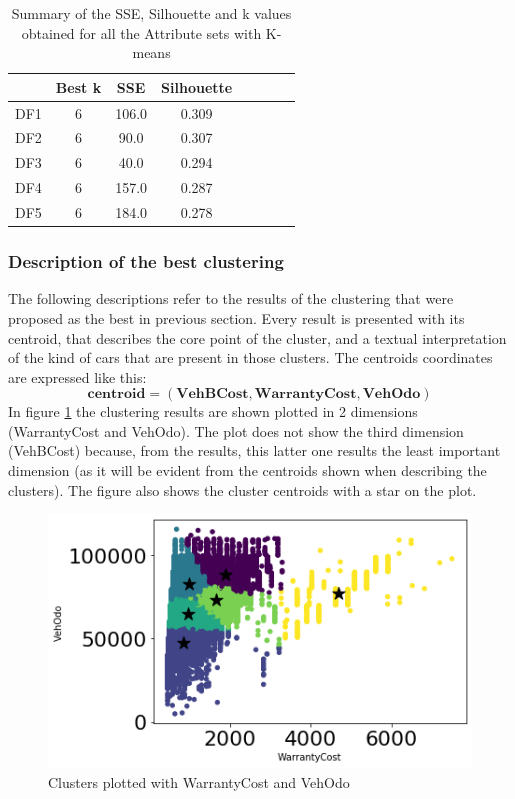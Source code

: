 \documentclass{article}
\begin{document}
	\begin{table}[H]
		\centering
		\begin{tabular}{c|ccccccc}
			\hline
			&  Best k & SSE& Silhouette \\
			\hline
			\rowcolor{Gray}
			DF1 & 6 & 106.0 & 0.309 \\
			DF2 & 6 & 90.0 & 0.307  \\
			\rowcolor{Gray}
			DF3 & 6 & 40.0 & 0.294 \\
			DF4 & 6 & 157.0 & 0.287  \\
			\rowcolor{Gray}
			DF5 & 6 & 184.0\textbf & 0.278 \\
		\end{tabular}
		\caption{{ Summary of the SSE, Silhouette and k values obtained for all the Attribute sets with K-means}}
		\label{tab:SSESilu}
	\end{table}
	
	
	\subsubsection{Description of the best clustering}
	\label{sec:clusterdescr}
	The following descriptions refer to the results of the clustering that were proposed as the best in previous section. Every result is presented with its centroid, that describes the core point of the cluster, and a textual interpretation of the kind of cars that are present in those clusters. 
	The centroids coordinates are expressed like this:  
	$$ \mathbf{centroid} = (\mathbf{VehBCost}, \mathbf{WarrantyCost}, \mathbf{VehOdo}) $$
	In figure \ref{fig:centroid} the clustering results are shown plotted in 2 dimensions (WarrantyCost and VehOdo). The plot does not show the third dimension (VehBCost) because, from the results, this latter one results the least important dimension (as it will be evident from the centroids shown when describing the clusters).
	The figure also shows the cluster centroids with a star on the plot. 
	
	\begin{figure}[H]
		\centering
		\includegraphics[width=.8\textwidth, keepaspectratio]{centroid}
		\caption{{Clusters plotted with WarrantyCost and VehOdo}}
		\label{fig:centroid}
	\end{figure}
	
\end{document}
